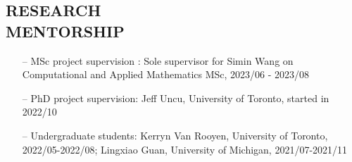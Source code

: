 \documentclass[margin]{res}
\begin{document}
\begin{resume}
\section{{\normalfont RESEARCH\\MENTORSHIP}}
\begin{itemize}[leftmargin=*,noitemsep]
\item[--]{MSc project supervision : Sole supervisor for Simin Wang on Computational and Applied Mathematics MSc, 2023/06 - 2023/08} 
\item[--]{PhD project supervision: Jeff Uncu, University of Toronto, started in 2022/10}
\item[--]{Undergraduate students: Kerryn Van Rooyen, University of Toronto, 2022/05-2022/08; Lingxiao Guan, University of Michigan, 2021/07-2021/11}
\end{itemize}


\end{resume}
\end{document}
